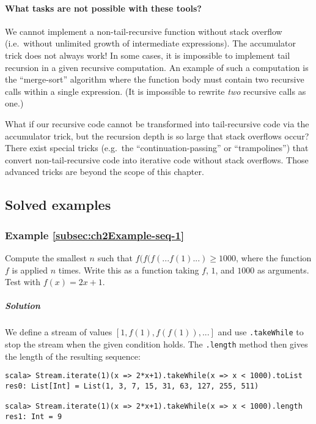 \paragraph*{What tasks are not possible with these tools?}

We cannot implement a non-tail-recursive function without stack overflow
(i.e.~without unlimited growth of intermediate expressions). The
accumulator trick does not always work! In some cases, it is impossible
to implement tail recursion in a given recursive computation. An example
of such a computation is the ``merge-sort'' algorithm where the
function body must contain two recursive calls within a single expression.
(It is impossible to rewrite \emph{two} recursive calls as one.) 

What if our recursive code cannot be transformed into tail-recursive
code via the accumulator trick, but the recursion depth is so large
that stack overflows occur? There exist special tricks (e.g.~the
``continuation-passing'' or ``trampolines'')
that convert non-tail-recursive code into iterative code without stack
overflows. Those advanced tricks are beyond the scope of this chapter.

\subsection{Solved examples}

\subsubsection{Example \label{subsec:ch2Example-seq-1}\ref{subsec:ch2Example-seq-1}}

Compute the smallest $n$ such that $f(f(f(...f(1)...)\geq1000$,
where the function $f$ is applied $n$ times. Write this as a function
taking $f$, $1$, and $1000$ as arguments. Test with $f(x)=2x+1$.

\subparagraph{Solution}

We define a stream of values $\left[1,f(1),f(f(1)),...\right]$ and
use \lstinline!.takeWhile! to stop the stream when the given condition
holds. The \lstinline!.length! method then gives the length of the
resulting sequence: 
\begin{lstlisting}
scala> Stream.iterate(1)(x => 2*x+1).takeWhile(x => x < 1000).toList
res0: List[Int] = List(1, 3, 7, 15, 31, 63, 127, 255, 511)

scala> Stream.iterate(1)(x => 2*x+1).takeWhile(x => x < 1000).length
res1: Int = 9
\end{lstlisting}


